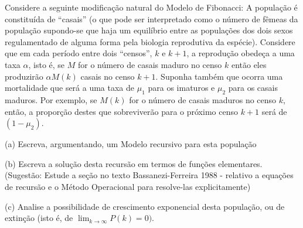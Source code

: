 \begin{exercise}
Considere a seguinte modificação natural do Modelo de Fibonacci: A população é constituída de ``casais'' (o que pode ser interpretado como o número de fêmeas da população supondo-se que haja um equilíbrio entre as populações dos dois sexos regulamentado de alguma forma pela biologia reprodutiva da espécie). Considere que em cada período entre dois ``censos'', \(k\) e \(k + 1\), a reprodução obedeça a uma taxa \(\alpha\), isto é, se \(M\) for o número de casais maduro no censo \(k\) então eles produzirão \(\alpha M(k)\) casais no censo \(k + 1\). Suponha também que ocorra uma mortalidade que será a uma taxa de \(\mu_1\) para os imaturos e \(\mu_2\) para os casais maduros. Por exemplo, se \(M(k)\) for o número de casais maduros no censo \(k\), então, a proporção destes que sobreviverão para o próximo censo \(k + 1\) será de \((1 - \mu_2)\). 
\begin{description}
\item (a) Escreva, argumentando, um Modelo recursivo para esta população
\item (b) Escreva a solução desta recursão em termos de funções elementares. (Sugestão: Estude a seção no texto Bassanezi-Ferreira 1988 - relativo a equações de recursão e o Método Operacional para resolve-las explicitamente)
\item (c) Analise a possibilidade de crescimento exponencial desta população, ou de extinção (isto é, de \(\displaystyle\lim_{k \to \infty} P(k) = 0)\).
\end{description}
\end{exercise}

